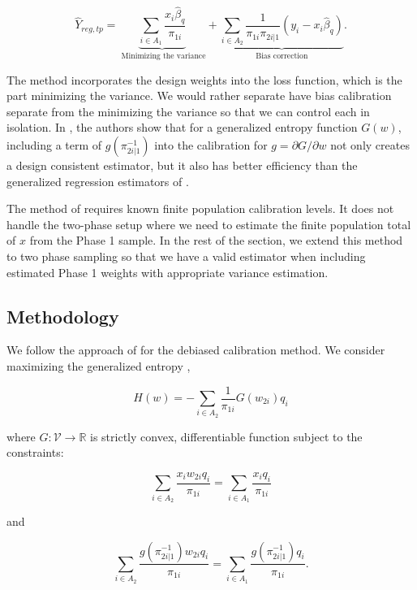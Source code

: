 \documentclass[12pt]{article}
\newcommand{\R}{\mathbb{R}}
\begin{document}
$$ \hat Y_{reg, tp} 
= \underbrace{\sum_{i \in A_1} \frac{x_i \hat \beta_q}{\pi_{1i}}}_{
  \text{ Minimizing the variance}} + \underbrace{\sum_{i \in A_2}
\frac{1}{\pi_{1i}\pi_{2i|1}} (y_i - x_i \hat \beta_q)}_{
\text{Bias correction}}.$$

The \cite{deville1992calibration} method incorporates the design weights into
the loss function, which is the part minimizing the variance. We would rather
separate have bias calibration separate from the minimizing the variance so that
we can control each in isolation. In
\cite{kwon2024debiased}, the authors show that for a generalized entropy
function $G(w)$, including a term of $g(\pi_{2i|1}^{-1})$ into the calibration
for $g = \partial G / \partial w$ not only creates a design consistent
estimator, but it also has better efficiency than the generalized regression
estimators of \cite{deville1992calibration}.

The method of \cite{kwon2024debiased} requires known finite population 
calibration levels. It does not handle the
two-phase setup where we need to estimate the finite population total of $x$
from the Phase 1 sample. In the rest of the section, we extend this method to 
two phase sampling so that we have a valid 
estimator when including estimated Phase 1 weights with appropriate variance
estimation.

\subsection{Methodology}

We follow the approach of \cite{kwon2024debiased} for the debiased calibration
method. We consider maximizing the generalized entropy \cite{gneiting2007strictly},

\begin{equation}\label{eq:primalloss}
  H(w) = - \sum_{i \in A_2} \frac{1}{\pi_{1i}} G(w_{2i}) q_i
\end{equation}

where $G: \mathcal{V} \to \R$ is strictly convex, differentiable function
subject to the constraints:

\begin{equation}\label{eq:calconst1}
  \sum_{i \in A_2} \frac{x_i w_{2i}q_i}{\pi_{1i}} = 
\sum_{i \in A_1} \frac{x_iq_i}{\pi_{1i}}
\end{equation}

and 

\begin{equation}\label{eq:calconst2}
  \sum_{i \in A_2} \frac{g(\pi_{2i|1}^{-1})w_{2i}q_i}{\pi_{1i}} = 
  \sum_{i \in A_1} \frac{g(\pi_{2i|1}^{-1})q_i}{\pi_{1i}}.
\end{equation}
\end{document}
